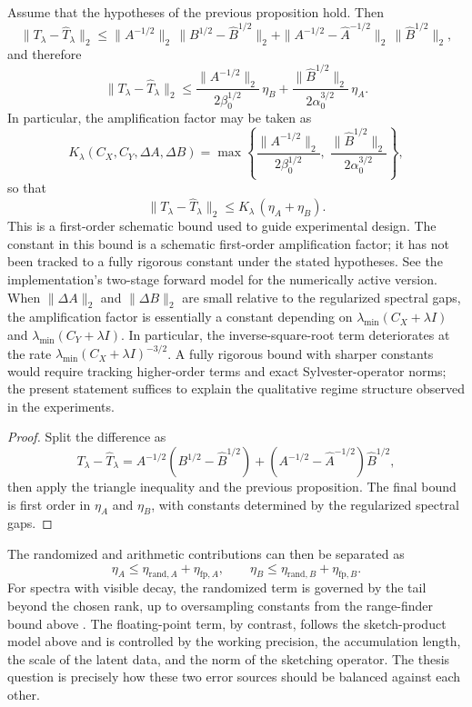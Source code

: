 \begin{theorem}
	\label{thm:cov_transport_perturbation}
	Assume that the hypotheses of the previous proposition hold. Then
	\[
		\|T_\lambda - \widehat T_\lambda\|_2
		\le
		\|A^{-1/2}\|_2\,\|B^{1/2} - \widehat B^{1/2}\|_2
		+
		\|A^{-1/2} - \widehat A^{-1/2}\|_2\,\|\widehat B^{1/2}\|_2,
	\]
	and therefore
	\[
		\|T_\lambda - \widehat T_\lambda\|_2
		\le
		\frac{\|A^{-1/2}\|_2}{2\beta_0^{1/2}}\,\eta_B
		+
		\frac{\|\widehat B^{1/2}\|_2}{2\alpha_0^{3/2}}\,\eta_A.
	\]
	In particular, the amplification factor may be taken as
	\[
		K_\lambda(C_X,C_Y,\Delta A,\Delta B)
		=
		\max\!\left\{
		\frac{\|A^{-1/2}\|_2}{2\beta_0^{1/2}},\;
		\frac{\|\widehat B^{1/2}\|_2}{2\alpha_0^{3/2}}
		\right\},
	\]
	so that
	\[
		\|T_\lambda - \widehat T_\lambda\|_2
		\le
		K_\lambda\,(\eta_A + \eta_B).
	\]
	This is a first-order schematic bound used to guide experimental design.
	The constant in this bound is a schematic first-order amplification factor;
	it has not been tracked to a fully rigorous constant under the stated
	hypotheses. See the implementation's two-stage forward model for the
	numerically active version.
	When \(\|\Delta A\|_2\) and \(\|\Delta B\|_2\) are small relative to the
	regularized spectral gaps, the amplification factor is essentially a constant
	depending on \(\lambda_{\min}(C_X+\lambda I)\) and
	\(\lambda_{\min}(C_Y+\lambda I)\). In particular, the inverse-square-root
	term deteriorates at the rate
	\(\lambda_{\min}(C_X+\lambda I)^{-3/2}\). A fully rigorous bound with
	sharper constants would require tracking higher-order terms and exact
	Sylvester-operator norms; the present statement suffices to explain the
	qualitative regime structure observed in the experiments.
\end{theorem}

\begin{proof}
	Split the difference as
	\[
		T_\lambda - \widehat T_\lambda
		=
		A^{-1/2}(B^{1/2} - \widehat B^{1/2})
		+
		(A^{-1/2} - \widehat A^{-1/2})\widehat B^{1/2},
	\]
	then apply the triangle inequality and the previous proposition. The final bound
	is first order in \(\eta_A\) and \(\eta_B\), with constants determined by the
	regularized spectral gaps.
\end{proof}

The randomized and arithmetic contributions can then be separated as
\[
	\eta_A \le \eta_{\mathrm{rand},A} + \eta_{\mathrm{fp},A},
	\qquad
	\eta_B \le \eta_{\mathrm{rand},B} + \eta_{\mathrm{fp},B}.
\]
For spectra with visible decay, the randomized term is governed by the tail beyond the chosen rank, up to oversampling constants from the range-finder bound above \cite{halko2011finding,martinsson2020randnla}. The floating-point term, by contrast, follows the sketch-product model above and is controlled by the working precision, the accumulation length, the scale of the latent data, and the norm of the sketching operator. The thesis question is precisely how these two error sources should be balanced against each other.

